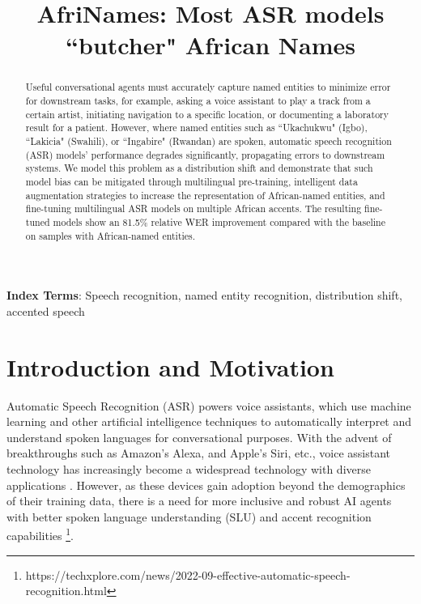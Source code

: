 \documentclass{INTERSPEECH2023}
\title{AfriNames: Most ASR models ``butcher" African Names}
\begin{document}
\maketitle
 
\begin{abstract}
Useful conversational agents must accurately capture named entities to minimize error for downstream tasks, for example, asking a voice assistant to play a track from a certain artist, initiating navigation to a specific location, or documenting a laboratory result for a patient. However, where named entities such as ``Ukachukwu" (Igbo), ``Lakicia" (Swahili), or ``Ingabire" (Rwandan) are spoken, automatic speech recognition (ASR) models' performance degrades significantly, propagating errors to downstream systems. We model this problem as a distribution shift and demonstrate that such model bias can be mitigated through multilingual pre-training, intelligent data augmentation strategies to increase the representation of African-named entities, and fine-tuning multilingual ASR models on multiple African accents. The resulting fine-tuned models show an 81.5\% relative WER improvement compared with the baseline on samples with African-named entities.
\end{abstract}

\noindent\textbf{Index Terms}: Speech recognition, named entity recognition, distribution shift, accented speech




\section{Introduction and Motivation}

Automatic Speech Recognition (ASR) powers voice assistants, which use machine learning and other artificial intelligence techniques to automatically interpret and understand spoken languages for conversational purposes. With the advent of breakthroughs such as 
Amazon's Alexa, and Apple's Siri, 
etc., voice assistant technology has increasingly become a widespread technology with diverse applications  \cite{siegert2021speaker}.
However, as these devices gain adoption beyond the demographics of their training data, there is a need for more inclusive and robust AI agents with better spoken language understanding (SLU) and accent recognition capabilities
\cite{desot2019towards, adelani2021masakhaner}\footnote{https://techxplore.com/news/2022-09-effective-automatic-speech-recognition.html}.
\end{document}
